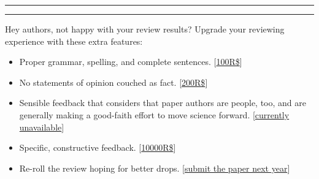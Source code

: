 \documentclass[10pt]{article}
\begin{document}
\hrule{}
\begin{center}
\end{center}

\hrule{}

Hey authors, not happy with your review results?
Upgrade your reviewing experience with these extra features:
\vspace{-1em}
\begin{itemize}
\item Proper grammar, spelling, and complete sentences. [\underline{100R\$}]
\item No statements of opinion couched as fact. [\underline{200R\$}]
\item Sensible feedback that considers that paper authors are people, too, and are generally making a good-faith effort to move science forward. [\underline{currently unavailable}]
\item Specific, constructive feedback. [\underline{10000R\$}]
\item Re-roll the review hoping for better drops. [\underline{submit the paper next year}]
\end{itemize}
\end{document}
